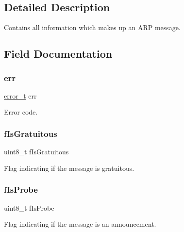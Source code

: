 \subsection{Detailed Description}
Contains all information which makes up an A\+RP message. 

\subsection{Field Documentation}
\mbox{\label{struct_a_r_p__message_a79e8f977787d9fccf257bbbccaaf3522}} 
\subsubsection{\texorpdfstring{err}{err}}
{\footnotesize\ttfamily \mbox{\hyperlink{group__error_gad3ae44be85fe6952dcaed425499e8f6b}{error\+\_\+t}} err}



Error code. 

\mbox{\label{struct_a_r_p__message_a10f6f518105e71039413d95c27db5a5d}} 
\subsubsection{\texorpdfstring{fIsGratuitous}{fIsGratuitous}}
{\footnotesize\ttfamily uint8\+\_\+t f\+Is\+Gratuitous}



Flag indicating if the message is gratuitous. 

\mbox{\label{struct_a_r_p__message_ad84934498bc8cb014f7ccfd3df0eaaab}} 
\subsubsection{\texorpdfstring{fIsProbe}{fIsProbe}}
{\footnotesize\ttfamily uint8\+\_\+t f\+Is\+Probe}



Flag indicating if the message is an announcement. 

\mbox{\label{struct_a_r_p__message_aff25a69752648654e56c4ff3e0b1b226}} 
